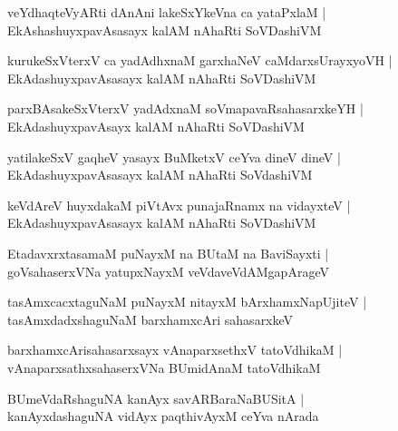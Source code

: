 \documentclass[twoside,12pt,openright]{book}
\newcounter{shloka}[chapter]
\begin{document}
\begin{shloka}%
veYdhaqteVyARti dAnAni lakeSxYkeVna ca yataPxlaM |\\
EkAshashuyxpavAsasayx kalAM nAhaRti SoVDashiVM 
\end{shloka}

\begin{shloka}%
kurukeSxVterxV ca yadAdhxnaM garxhaNeV caMdarxsUrayxyoVH |\\
EkAdashuyxpavAsasayx kalAM nAhaRti SoVDashiVM 
\end{shloka}

\begin{shloka}%
parxBAsakeSxVterxV yadAdxnaM soVmapavaRsahasarxkeYH |\\
EkAdashuyxpavAsayx kalAM nAhaRti SoVDashiVM 
\end{shloka}

\begin{shloka}%
yatilakeSxV gaqheV yasayx BuMketxV ceYva dineV dineV |\\
EkAdashuyxpavAsasayx kalAM nAhaRti SoVdashiVM 
\end{shloka}

\begin{shloka}%
keVdAreV huyxdakaM piVtAvx punajaRnamx na vidayxteV |\\
EkAdashuyxpavAsasayx kalAM nAhaRti SoVDashiVM
\end{shloka}

\begin{shloka}%
EtadavxrxtasamaM puNayxM  na BUtaM na BaviSayxti |\\
goVsahaserxVNa yatupxNayxM veVdaveVdAMgapArageV
\end{shloka}

\begin{shloka}%
tasAmxcacxtaguNaM puNayxM nitayxM bArxhamxNapUjiteV |\\
tasAmxdadxshaguNaM barxhamxcAri sahasarxkeV 
\end{shloka}

\begin{shloka}%
barxhamxcArisahasarxsayx vAnaparxsethxV tatoVdhikaM |\\
vAnaparxsathxsahaserxVNa BUmidAnaM tatoVdhikaM 
\end{shloka}

\begin{shloka}%
BUmeVdaRshaguNA kanAyx savARBaraNaBUSitA |\\
kanAyxdashaguNA vidAyx paqthivAyxM ceYva nArada
\end{shloka}
\end{document}
